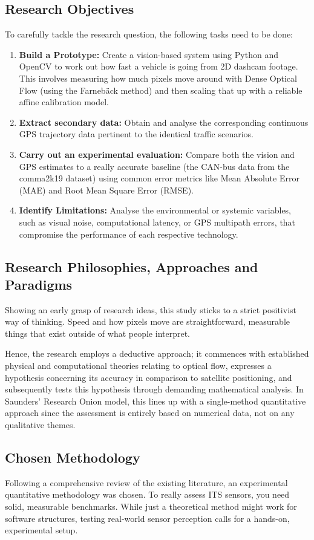 \subsection{Research Objectives}
To carefully tackle the research question, the following tasks need to be done:
\begin{enumerate}
    \item \textbf{Build a Prototype:} Create a vision-based system using Python and OpenCV to work out how fast a vehicle is going from 2D dashcam footage. This involves measuring how much pixels move around with Dense Optical Flow (using the Farnebäck method) and then scaling that up with a reliable affine calibration model.
    \item \textbf{Extract secondary data:} Obtain and analyse the corresponding continuous GPS trajectory data pertinent to the identical traffic scenarios.
    \item \textbf{Carry out an experimental evaluation:} Compare both the vision and GPS estimates to a really accurate baseline (the CAN-bus data from the comma2k19 dataset) using common error metrics like Mean Absolute Error (MAE) and Root Mean Square Error (RMSE).
    \item \textbf{Identify Limitations:} Analyse the environmental or systemic variables, such as visual noise, computational latency, or GPS multipath errors, that compromise the performance of each respective technology.
\end{enumerate}

\subsection{Research Philosophies, Approaches and Paradigms}
Showing an early grasp of research ideas, this study sticks to a strict positivist way of thinking. Speed and how pixels move are straightforward, measurable things that exist outside of what people interpret. 

Hence, the research employs a deductive approach; it commences with established physical and computational theories relating to optical flow, expresses a hypothesis concerning its accuracy in comparison to satellite positioning, and subsequently tests this hypothesis through demanding mathematical analysis. In Saunders' Research Onion model, this lines up with a single-method quantitative approach since the assessment is entirely based on numerical data, not on any qualitative themes.

\subsection{Chosen Methodology}
Following a comprehensive review of the existing literature, an experimental quantitative methodology was chosen. To really assess ITS sensors, you need solid, measurable benchmarks. While just a theoretical method might work for software structures, testing real-world sensor perception calls for a hands-on, experimental setup. 

